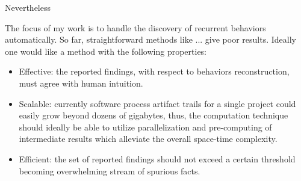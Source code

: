 \documentclass[12pt,oneside]{report}
\numberwithin{equation}{subsection}
\begin{document}
Nevertheless 

The focus of my work is to handle the discovery of recurrent behaviors automatically. So far, straightforward 
methods like ... give poor results. Ideally one would like a method with the following properties:
\begin{itemize}
 \item Effective: the reported findings, with respect to behaviors reconstruction, must agree with human intuition.
 \item Scalable: currently software process artifact trails for a single project could easily grow beyond dozens of
       gigabytes, thus, the computation technique should ideally be able to utilize parallelization and pre-computing
       of intermediate results which alleviate the overall space-time complexity.
 \item Efficient: the set of reported findings should not exceed a certain threshold becoming overwhelming stream 
       of spurious facts.
\end{itemize}
\end{document}
